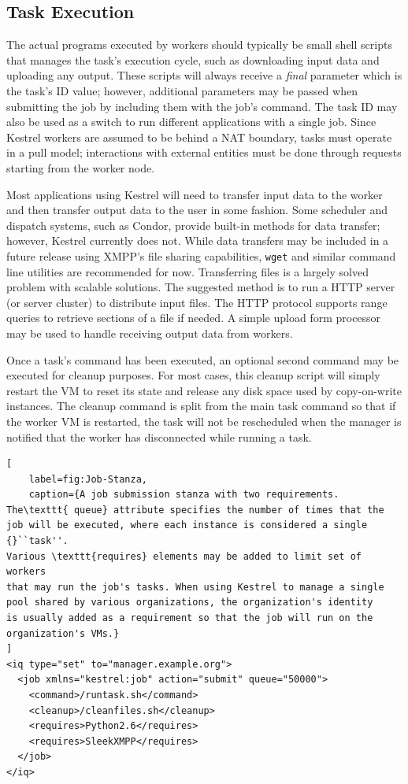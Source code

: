 \subsection{Task Execution}

\label{sec:Kestrel:Execution} The actual programs executed by workers
should typically be small shell scripts that manages the task's execution
cycle, such as downloading input data and uploading any output. These
scripts will always receive a \textit{final} parameter which is the
task's ID value; however, additional parameters may be passed when
submitting the job by including them with the job's command. The task
ID may also be used as a switch to run different applications with
a single job. Since Kestrel workers are assumed to be behind a NAT
boundary, tasks must operate in a pull model; interactions with external
entities must be done through requests starting from the worker node.

Most applications using Kestrel will need to transfer input data to
the worker and then transfer output data to the user in some fashion.
Some scheduler and dispatch systems, such as Condor, provide built-in
methods for data transfer; however, Kestrel currently does not. While
data transfers may be included in a future release using XMPP's file
sharing capabilities, \texttt{wget} and similar command line utilities
are recommended for now. Transferring files is a largely solved problem
with scalable solutions. The suggested method is to run a HTTP server
(or server cluster) to distribute input files. The HTTP protocol supports
range queries to retrieve sections of a file if needed. A simple upload
form processor may be used to handle receiving output data from workers.

Once a task's command has been executed, an optional second command
may be executed for cleanup purposes. For most cases, this cleanup
script will simply restart the VM to reset its state and release any
disk space used by copy-on-write instances. The cleanup command is
split from the main task command so that if the worker VM is restarted,
the task will not be rescheduled when the manager is notified that
the worker has disconnected while running a task.

\begin{lstlisting}[
    label=fig:Job-Stanza,
    caption={A job submission stanza with two requirements.
The\texttt{ queue} attribute specifies the number of times that the
job will be executed, where each instance is considered a single {}``task''.
Various \texttt{requires} elements may be added to limit set of workers
that may run the job's tasks. When using Kestrel to manage a single
pool shared by various organizations, the organization's identity
is usually added as a requirement so that the job will run on the
organization's VMs.}
]
<iq type="set" to="manager.example.org"> 
  <job xmlns="kestrel:job" action="submit" queue="50000"> 
    <command>/runtask.sh</command> 
    <cleanup>/cleanfiles.sh</cleanup> 
    <requires>Python2.6</requires> 
    <requires>SleekXMPP</requires> 
  </job> 
</iq>
\end{lstlisting}


